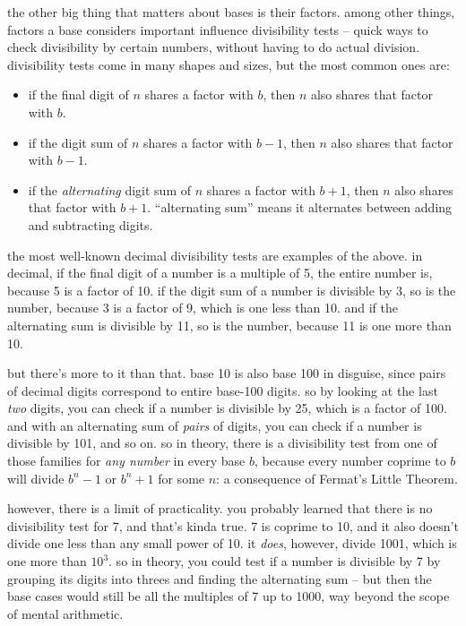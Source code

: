 \documentclass[../best.tex]{subfiles}
\begin{document}

the other big thing that matters about bases is their factors. among other things, factors a base considers important influence divisibility tests -- quick ways to check divisibility by certain numbers, without having to do actual division. divisibility tests come in many shapes and sizes, but the most common ones are:

\begin{itemize}
	\item if the final digit of $n$ shares a factor with $b$, then $n$ also shares that factor with $b$.
	\item if the digit sum of $n$ shares a factor with $b - 1$, then $n$ also shares that factor with $b - 1$.
	\item if the \emph{alternating} digit sum of $n$ shares a factor with $b + 1$, then $n$ also shares that factor with $b + 1$. ``alternating sum'' means it alternates between adding and subtracting digits.\myfootnote{}
\end{itemize}

the most well-known decimal divisibility tests are examples of the above. in decimal, if the final digit of a number is a multiple of 5, the entire number is, because 5 is a factor of 10. if the digit sum of a number is divisible by 3, so is the number, because 3 is a factor of 9, which is one less than 10. and if the alternating sum is divisible by 11, so is the number, because 11 is one more than 10.\myfootnote{}

but there's more to it than that. base 10 is also base 100 in disguise, since pairs of decimal digits correspond to entire base-100 digits. so by looking at the last \emph{two} digits, you can check if a number is divisible by 25, which is a factor of 100. and with an alternating sum of \emph{pairs} of digits, you can check if a number is divisible by 101, and so on. so in theory, there is a divisibility test from one of those families for \emph{any number} in every base $b$, because every number coprime to $b$ will divide $b^n - 1$ or $b^n + 1$ for some $n$: a consequence of Fermat's Little Theorem.\myfootnote{}

however, there is a limit of practicality. you probably learned that there is no divisibility test for 7, and that's kinda true. 7 is coprime to 10, and it also doesn't divide one less than any small power of 10. it \emph{does}, however, divide 1001, which is one more than $10^3$. so in theory, you could test if a number is divisible by 7 by grouping its digits into threes and finding the alternating sum -- but then the base cases would still be all the multiples of 7 up to 1000, way beyond the scope of mental arithmetic.\myfootnote{}
\end{document}
